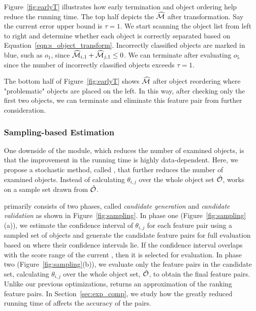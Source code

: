 \begin{example}
Figure~\ref{fig:earlyT} illustrates how early termination and object ordering help reduce the running time. The top half depicts the $\widehat{\mm}$ after transformation. Say the current error upper bound is $\tau=1$. We start scanning the object list from left to right and determine whether each object is correctly separated based on Equation~\ref{eqn:s_object_transform}. Incorrectly classified objects are marked in blue, such as $o_1$, since $\widehat{\mm}_{i,1}+\widehat{\mm}_{j,1}\leq0$. We can terminate after evaluating $o_5$ since the number of incorrectly classified objects exceeds $\tau=1$.

The bottom half of Figure~\ref{fig:earlyT} shows $\widehat{\mm}$ after object reordering where "problematic" objects are placed on the left. In this way, after checking only the first two objects, we can terminate and eliminate this feature pair from further consideration.
\end{example}


\subsubsection{Sampling-based Estimation} \label{ssec:sampling}

One downside of the \earlyT module, which reduces the number of examined objects, is that the improvement in the running time is highly data-dependent. Here, we propose a stochastic method, called \sampling, that further reduces the number of examined objects. Instead of calculating $\theta_{i,j}$ over the whole object set $\hat{\oo}$, \sampling works on a sample set drawn from $\hat{\oo}$.

 \sampling primarily consists of two phases, called {\em candidate generation} and {\em candidate validation} as shown in Figure~\ref{fig:sampling}. In phase one (Figure~\ref{fig:sampling}(a)), we estimate the confidence interval of $\theta_{i,j}$ for each feature pair using a sampled set of objects and generate the candidate feature pairs for full evaluation based on where their confidence intervals lie. If the confidence interval overlaps with the score range of the current \topk, then it is selected for evaluation. In phase two (Figure~\ref{fig:sampling}(b)), we evaluate only the feature pairs in the candidate set, calculating $\theta_{i,j}$ over the whole object set, $\hat{\oo}$, to obtain the final \topk feature pairs. Unlike our previous optimizations, \sampling returns an approximation of the \topk ranking feature pairs. In Section~\ref{sec:exp_comp}, we study how the greatly reduced running time of \sampling  affects the accuracy of the \topk pairs. %

